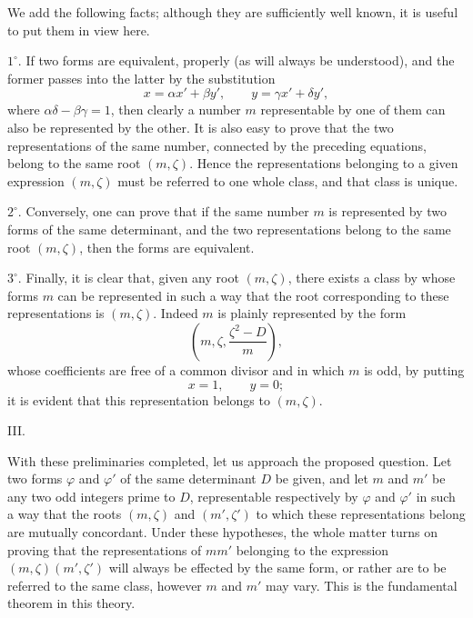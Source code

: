 \documentclass[11pt]{article}
\begin{document}
We add the following facts; although they are sufficiently well known, it is useful to put them in view here.

$1^\circ$. If two forms are equivalent, properly (as will always be understood), and the former passes into the latter by the substitution
\[
 x=\alpha x'+\beta y',\qquad y=\gamma x'+\delta y',
\]
where $\alpha\delta-\beta\gamma=1$, then clearly a number $m$ representable by one of them can also be represented by the other. It is also easy to prove that the two representations of the same number, connected by the preceding equations, belong to the same root $(m,\zeta)$. Hence the representations belonging to a given expression $(m,\zeta)$ must be referred to one whole class, and that class is unique.

$2^\circ$. Conversely, one can prove that if the same number $m$ is represented by two forms of the same determinant, and the two representations belong to the same root $(m,\zeta)$, then the forms are equivalent.

$3^\circ$. Finally, it is clear that, given any root $(m,\zeta)$, there exists a class by whose forms $m$ can be represented in such a way that the root corresponding to these representations is $(m,\zeta)$. Indeed $m$ is plainly represented by the form
\[
 \left(m,\zeta,\frac{\zeta^2-D}{m}\right),
\]
whose coefficients are free of a common divisor and in which $m$ is odd, by putting
\[
 x=1,\qquad y=0;
\]
it is evident that this representation belongs to $(m,\zeta)$.

\begin{center}III.\end{center}

With these preliminaries completed, let us approach the proposed question. Let two forms $\varphi$ and $\varphi'$ of the same determinant $D$ be given, and let $m$ and $m'$ be any two odd integers prime to $D$, representable respectively by $\varphi$ and $\varphi'$ in such a way that the roots $(m,\zeta)$ and $(m',\zeta')$ to which these representations belong are mutually concordant. Under these hypotheses, the whole matter turns on proving that the representations of $mm'$ belonging to the expression $(m,\zeta)(m',\zeta')$ will always be effected by the same form, or rather are to be referred to the same class, however $m$ and $m'$ may vary. This is the fundamental theorem in this theory.
\end{document}
